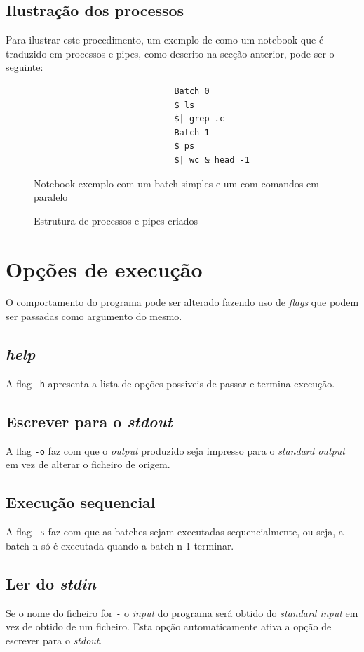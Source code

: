 \documentclass[12pt,a4paper]{report}
\begin{document}
    \section{Ilustração dos processos}
    Para ilustrar este procedimento, um exemplo de como um notebook que é
    traduzido em processos e pipes, como descrito na secção anterior, pode
    ser o seguinte:
    \begin{figure}[h]
        \begin{verbatim}
                            Batch 0
                            $ ls
                            $| grep .c
                            Batch 1
                            $ ps
                            $| wc & head -1
        \end{verbatim}
        \caption{Notebook exemplo com um batch simples e um com comandos em
                paralelo}
    \end{figure}
    \begin{figure}[h]
        
        \caption{Estrutura de processos e pipes criados}
    \end{figure}

\chapter{Opções de execução}
    O comportamento do programa pode ser alterado fazendo uso de \textit{flags}
    que podem ser passadas como argumento do mesmo.
    \section{\textit{help}}
        A flag \texttt{-h} apresenta a lista de opções possiveis
        de passar e termina execução.
    \section{Escrever para o \textit{stdout}}
        A flag \texttt{-o} faz com que o \textit{output} produzido
        seja impresso para o \textit{standard output} em vez de alterar o
        ficheiro de origem.
    \section{Execução sequencial}
        A flag \texttt{-s} faz com que as batches sejam executadas
        sequencialmente, ou seja, a batch n só é executada quando a batch n-1
        terminar.
    \section{Ler do \textit{stdin}}
        Se o nome do ficheiro for \texttt{-} o \textit{input} do
        programa será obtido do \textit{standard input} em vez de obtido de um
        ficheiro. Esta opção automaticamente ativa a opção de escrever para o
        \textit{stdout}.
\end{document}
